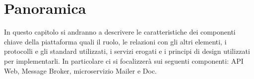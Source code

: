 \section{Panoramica}
In questo capitolo si andranno a descrivere le caratteristiche dei componenti chiave della piattaforma quali il ruolo, le relazioni con gli altri elementi,
i protocolli e gli standard utilizzati, i servizi erogati e i principi di design utilizzati per implementarli.
In particolare ci si focalizzerà sui seguenti componenti: API Web, Message Broker, microservizio Mailer e Doc.
